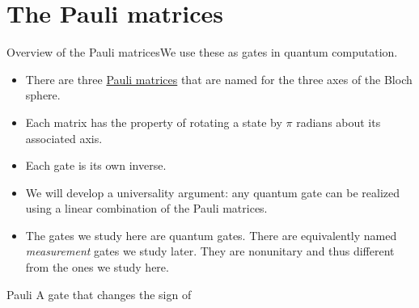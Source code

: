 \section{The Pauli matrices}

\begin{frame}{Overview of the Pauli matrices}{We use these as gates in quantum computation.}

\begin{itemize}
    \item There are three \href{https://en.wikipedia.org/wiki/Pauli_matrices}{Pauli matrices} that are named for the three axes of the Bloch sphere.
    \item Each matrix has the property of rotating a state by $\pi$ radians about its associated axis.
    \item Each gate is its own inverse.
    \item We will develop a universality argument:  any quantum gate can be realized using a linear combination of the Pauli matrices.
    \item The gates we study here are quantum gates.  There are equivalently named \emph{measurement} gates we study later.  They are nonunitary and thus different from the ones we study here.
\end{itemize}
    
\end{frame}

\begin{frame}{Pauli \PauliZ{}}{A gate that changes the sign of }

\end{frame}

